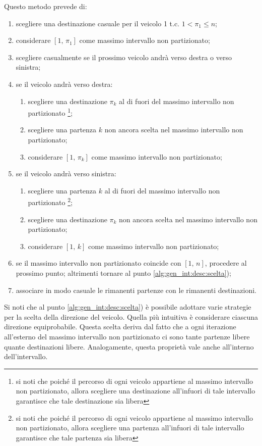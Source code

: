 \documentclass[../../../main.tex]{subfiles}
\begin{document}
Questo metodo prevede di:
\begin{enumerate}
    \item scegliere una destinazione casuale per il veicolo 1 t.c. $1 < \pi_1 \leq n$;
    \item considerare $[1,\, \pi_1]$ come massimo intervallo non partizionato;
    \item scegliere casualmente se il prossimo veicolo andrà verso destra o verso sinistra;
    \label{alg:gen_int:desc:scelta}
    \item se il veicolo andrà verso destra:
    \begin{enumerate}
        \item scegliere una destinazione $\pi_k$ al di fuori del massimo intervallo non partizionato
        \footnote{si noti che poiché il percorso di ogni veicolo appartiene al massimo intervallo non partizionato, allora scegliere una destinazione all'infuori di tale intervallo garantisce che tale destinazione sia libera};
        \item scegliere una partenza $k$ non ancora scelta nel massimo intervallo non partizionato;
        \item considerare $[1,\, \pi_k]$ come massimo intervallo non partizionato;
    \end{enumerate}
    \item se il veicolo andrà verso sinistra:
    \begin{enumerate}
        \item scegliere una partenza $k$ al di fuori del massimo intervallo non partizionato
        \footnote{si noti che poiché il percorso di ogni veicolo appartiene al massimo intervallo non partizionato, allora scegliere una partenza all'infuori di tale intervallo garantisce che tale partenza sia libera};
        \item scegliere una destinazione $\pi_k$ non ancora scelta nel massimo intervallo non partizionato;
        \item considerare $[1,\, k]$ come massimo intervallo non partizionato;
    \end{enumerate}
    \item se il massimo intervallo non partizionato coincide con $[1,\, n]$, procedere al prossimo punto;
    altrimenti tornare al punto \ref{alg:gen_int:desc:scelta});
    \item associare in modo casuale le rimanenti partenze con le rimanenti destinazioni.
\end{enumerate}

Si noti che al punto \ref{alg:gen_int:desc:scelta}) è possibile adottare varie strategie per la scelta della direzione del veicolo.
Quella più intuitiva è considerare ciascuna direzione equiprobabile.
Questa scelta deriva dal fatto che a ogni iterazione all'esterno del massimo intervallo non partizionato ci sono tante partenze libere quante destinazioni libere.
Analogamente, questa proprietà vale anche all'interno dell'intervallo.
\end{document}
